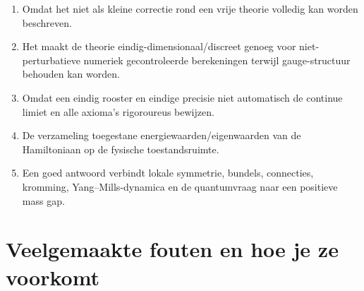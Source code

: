 \documentclass[11pt,a4paper]{article}
\begin{document}
\begin{enumerate}
\item Omdat het niet als kleine correctie rond een vrije theorie volledig kan worden beschreven.
\item Het maakt de theorie eindig-dimensionaal/discreet genoeg voor niet-perturbatieve numeriek gecontroleerde berekeningen terwijl gauge-structuur behouden kan worden.
\item Omdat een eindig rooster en eindige precisie niet automatisch de continue limiet en alle axioma's rigoroureus bewijzen.
\item De verzameling toegestane energiewaarden/eigenwaarden van de Hamiltoniaan op de fysische toestandsruimte.
\item Een goed antwoord verbindt lokale symmetrie, bundels, connecties, kromming, Yang--Mills-dynamica en de quantumvraag naar een positieve mass gap.
\end{enumerate}

\newpage
\section{Veelgemaakte fouten en hoe je ze voorkomt}
\end{document}
